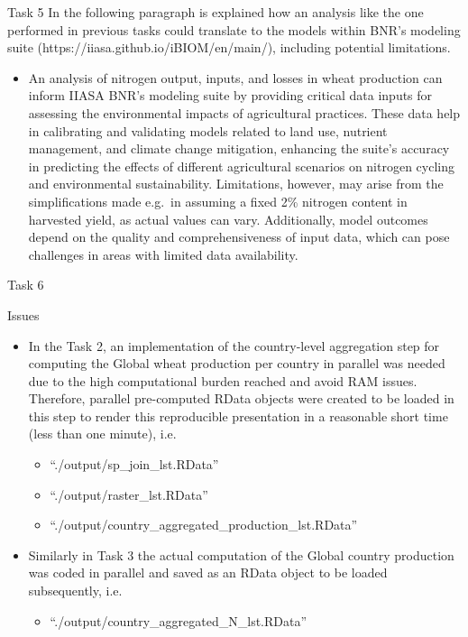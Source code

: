 \documentclass[
  ignorenonframetext,
  aspectratio=169,
]{beamer}
\providecommand{\tightlist}{%
  \setlength{\itemsep}{0pt}\setlength{\parskip}{0pt}}\usepackage{longtable,booktabs,array}
\begin{document}
\begin{frame}{Task 5}
\protect\hypertarget{task-5}{}
In the following paragraph is explained how an analysis like the one
performed in previous tasks could translate to the models within BNR's
modeling suite (https://iiasa.github.io/iBIOM/en/main/), including
potential limitations.

\begin{itemize}[<+->]
\tightlist
\item
  An analysis of nitrogen output, inputs, and losses in wheat production
  can inform IIASA BNR's modeling suite by providing critical data
  inputs for assessing the environmental impacts of agricultural
  practices. These data help in calibrating and validating models
  related to land use, nutrient management, and climate change
  mitigation, enhancing the suite's accuracy in predicting the effects
  of different agricultural scenarios on nitrogen cycling and
  environmental sustainability. Limitations, however, may arise from the
  simplifications made e.g.~in assuming a fixed 2\% nitrogen content in
  harvested yield, as actual values can vary. Additionally, model
  outcomes depend on the quality and comprehensiveness of input data,
  which can pose challenges in areas with limited data availability.
\end{itemize}
\end{frame}

\begin{frame}{Task 6}
\protect\hypertarget{task-6}{}
\begin{block}{Issues}
\protect\hypertarget{issues}{}
\begin{itemize}[<+->]
\item
  In the Task 2, an implementation of the country-level aggregation step
  for computing the Global wheat production per country in parallel was
  needed due to the high computational burden reached and avoid RAM
  issues. Therefore, parallel pre-computed RData objects were created to
  be loaded in this step to render this reproducible presentation in a
  reasonable short time (less than one minute), i.e.

  \begin{itemize}[<+->]
  \item
    ``./output/sp\_join\_lst.RData''
  \item
    ``./output/raster\_lst.RData''
  \item
    ``./output/country\_aggregated\_production\_lst.RData''
  \end{itemize}
\item
  Similarly in Task 3 the actual computation of the Global country
  production was coded in parallel and saved as an RData object to be
  loaded subsequently, i.e.

  \begin{itemize}[<+->]
  \tightlist
  \item
    ``./output/country\_aggregated\_N\_lst.RData''
  \end{itemize}
\end{itemize}
\end{block}
\end{frame}
\end{document}
